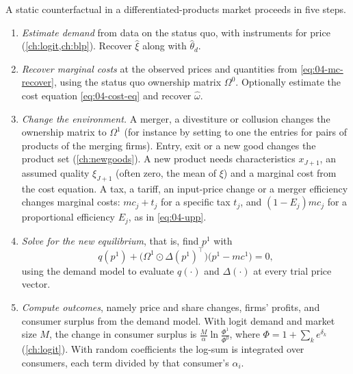 \begin{remark}\label{rem:04-algorithms}
A static counterfactual in a differentiated-products market proceeds in five steps.
\begin{enumerate}
  \item \emph{Estimate demand} from data on the status quo, with instruments for price (\cref{ch:logit,ch:blp}).
  Recover $\hat\xi$ along with $\hat\theta_d$.
  \item \emph{Recover marginal costs} at the observed prices and quantities from \eqref{eq:04-mc-recover}, using
  the status quo ownership matrix $\Omega^0$. Optionally estimate the cost equation \eqref{eq:04-cost-eq} and
  recover $\hat\omega$.
  \item \emph{Change the environment.} A merger, a divestiture or collusion changes the ownership matrix to
  $\Omega^1$ (for instance by setting to one the entries for pairs of products of the merging firms). Entry, exit or
  a new good changes the product set (\cref{ch:newgoods}). A new product needs characteristics $x_{J+1}$, an assumed
  quality $\xi_{J+1}$ (often zero, the mean of $\xi$) and a marginal cost from the cost equation. A tax, a tariff, an
  input-price change or a merger efficiency changes marginal costs: $mc_j + t_j$ for a specific tax $t_j$, and
  $(1 - E_j)mc_j$ for a proportional efficiency $E_j$, as in \eqref{eq:04-upp}.
  \item \emph{Solve for the new equilibrium}, that is, find $p^1$ with
  \begin{equation*}
  q(p^1) + \big(\Omega^1 \odot \Delta(p^1)^\top\big)\big(p^1 - mc^1\big) = 0 ,
  \end{equation*}
  using the demand model to evaluate $q(\cdot)$ and $\Delta(\cdot)$ at every trial price vector.
  \item \emph{Compute outcomes}, namely price and share changes, firms' profits, and consumer surplus from the
  demand model. With logit demand and market size $M$, the change in consumer surplus is $\frac{M}{\alpha}\ln\frac{\Phi^1}
  {\Phi^0}$, where $\Phi = 1 + \sum_k e^{\delta_k}$ (\cref{ch:logit}). With random coefficients the log-sum is
  integrated over consumers, each term divided by that consumer's $\alpha_i$.
\end{enumerate}
\end{remark}

